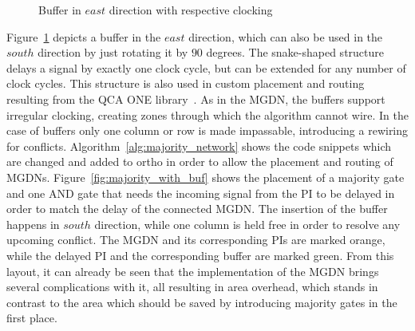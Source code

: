 \begin{figure}
	\caption{Buffer in $east$ direction with respective clocking}\label{fig:QCA_buf}
\end{figure}

Figure~\ref{fig:QCA_buf} depicts a buffer in the $east$ direction, which can also be used in the $south$ direction by just rotating it by $90$ degrees. The snake-shaped structure delays a signal by exactly one clock cycle, but can be extended for any number of clock cycles. This structure is also used in custom placement and routing resulting from the QCA ONE library~\cite{QCA_scl}. As in the MGDN, the buffers support irregular clocking, creating zones through which the algorithm cannot wire. In the case of buffers only one column or row is made impassable, introducing a rewiring for conflicts. Algorithm~\ref{alg:majority_network} shows the code snippets which are changed and added to ortho in order to allow the placement and routing of MGDNs. Figure~\ref{fig:majority_with_buf} shows the placement of a majority gate and one AND gate that needs the incoming signal from the PI to be delayed in order to match the delay of the connected MGDN. The insertion of the buffer happens in $south$ direction, while one column is held free in order to resolve any upcoming conflict. The MGDN and its corresponding PIs are marked orange, while the delayed PI and the corresponding buffer are marked green. From this layout, it can already be seen that the implementation of the MGDN brings several complications with it, all resulting in area overhead, which stands in contrast to the area which should be saved by introducing majority gates in the first place.

